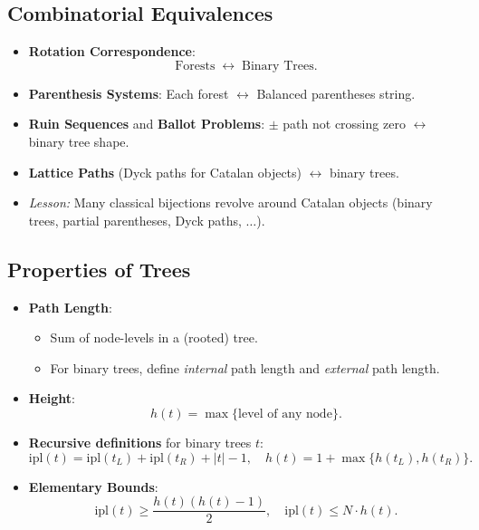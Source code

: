 \documentclass[11pt,letterpaper]{article}
\begin{document}
\subsection{Combinatorial Equivalences}
\begin{itemize}
  \item \textbf{Rotation Correspondence}: 
    \[
      \text{Forests} \;\longleftrightarrow\;\text{Binary Trees}.
    \]
  \item \textbf{Parenthesis Systems}: Each forest $\leftrightarrow$ Balanced parentheses string.
  \item \textbf{Ruin Sequences} and \textbf{Ballot Problems}: $\pm$ path not crossing zero $\leftrightarrow$ binary tree shape.
  \item \textbf{Lattice Paths} (Dyck paths for Catalan objects) $\leftrightarrow$ binary trees.
  \item \emph{Lesson:} Many classical bijections revolve around Catalan objects (binary trees, partial parentheses, Dyck paths, $\ldots$).
\end{itemize}

\subsection{Properties of Trees}
\begin{itemize}
  \item \textbf{Path Length}:
    \begin{itemize}
      \item Sum of node-levels in a (rooted) tree. 
      \item For binary trees, define \textit{internal} path length and \textit{external} path length.
    \end{itemize}
  \item \textbf{Height}:
    \[
      h(t)=\max\{\text{level of any node}\}.
    \]
  \item \textbf{Recursive definitions} for binary trees $t$:
    \[
      \mathrm{ipl}(t)=\mathrm{ipl}(t_L)+\mathrm{ipl}(t_R)+|t|-1,\quad
      h(t)=1+\max\{h(t_L),h(t_R)\}.
    \]
  \item \textbf{Elementary Bounds}:
    \[
      \mathrm{ipl}(t)\geq \frac{h(t)(h(t)-1)}{2}, \quad
      \mathrm{ipl}(t)\le N\cdot h(t).
    \]
\end{itemize}

\end{document}
